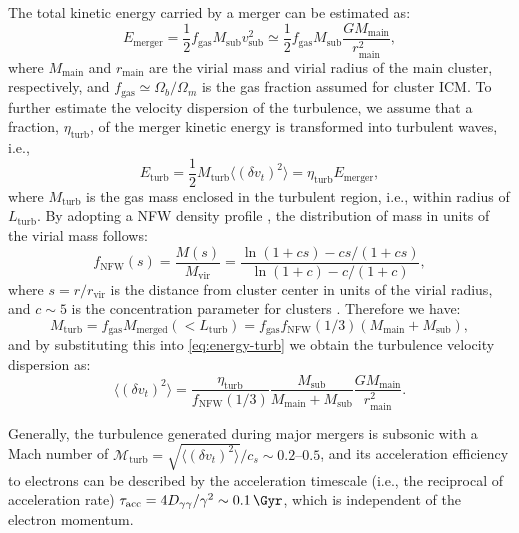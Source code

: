 \documentclass[modern]{aastex61}
\newcommand{\R}[1]{\mathrm{#1}}
\begin{document}
The total kinetic energy carried by a merger can be estimated as:
\begin{equation}
  \label{eq:energy-merger}
  E_{\R{merger}} = \frac{1}{2} f_{\R{gas}} M_{\R{sub}} v^2_{\R{sub}}
    \simeq \frac{1}{2} f_{\R{gas}} M_{\R{sub}} \frac{G M_{\R{main}}}{r^2_{\R{main}}},
\end{equation}
where $M_{\R{main}}$ and $r_{\R{main}}$ are the virial mass and virial
radius of the main cluster, respectively,
and $f_{\R{gas}} \simeq \Omega_b/\Omega_m$ is the gas fraction assumed
for cluster ICM.
To further estimate the velocity dispersion of the turbulence, we assume
that a fraction, $\eta_{\R{turb}}$, of the merger kinetic energy is
transformed into turbulent waves, i.e.,
\begin{equation}
  \label{eq:energy-turb}
  E_{\R{turb}} = \frac{1}{2} M_{\R{turb}} \langle (\delta{v_t})^2 \rangle
    = \eta_{\R{turb}} E_{\R{merger}},
\end{equation}
where
$M_{\R{turb}}$ is the gas mass enclosed in the turbulent region, i.e.,
within radius of $L_{\R{turb}}$.
By adopting a NFW density profile \citep{navarro1997}, the distribution
of mass in units of the virial mass follows:
\begin{equation}
  \label{eq:mass-dist-nfw}
  f_{\R{NFW}}(s) = \frac{M(s)}{M_{\R{vir}}} =
    \frac{\ln(1 + c s) - c s / (1 + c s)}{\ln(1 + c) - c / (1 + c)},
\end{equation}
where $s = r / r_{\R{vir}}$ is the distance from cluster center in units
of the virial radius, and $c \sim 5$ is the concentration parameter for
clusters \citep{lokas2001}.
Therefore we have:
\begin{equation}
  \label{eq:mass-turb}
  M_{\R{turb}} = f_{\R{gas}} M_{\R{merged}}(<L_{\R{turb}})
    = f_{\R{gas}} f_{\R{NFW}}(1/3) (M_{\R{main}} + M_{\R{sub}}),
\end{equation}
and by substituting this into \autoref{eq:energy-turb} we obtain
the turbulence velocity dispersion as:
\begin{equation}
  \label{eq:turb-velocity-dispersion}
  \langle (\delta{v_t})^2 \rangle =
    \frac{\eta_{\R{turb}}}{f_{\R{NFW}}(1/3)}
    \frac{M_{\R{sub}}}{M_{\R{main}} + M_{\R{sub}}}
    \frac{G M_{\R{main}}}{r^2_{\R{main}}}.
\end{equation}

Generally, the turbulence generated during major mergers is subsonic
with a Mach number of
$\mathcal{M}_{\R{turb}} = \sqrt{\langle (\delta{v_t})^2 \rangle} / c_s \sim \numrange{0.2}{0.5}$,
and its acceleration efficiency to electrons can be described by the
acceleration timescale (i.e., the reciprocal of acceleration rate)
$\tau_{\R{acc}} = 4 D_{\gamma\gamma} / \gamma^2 \sim \SI{0.1}{\Gyr}$,
which is independent of the electron momentum.
\end{document}
